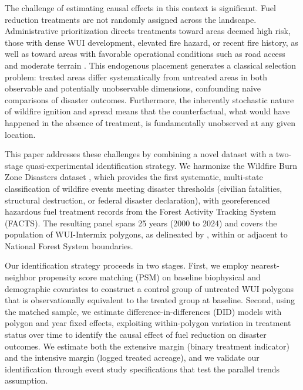\documentclass[12pt, letterpaper]{article}
\begin{document}
The challenge of estimating causal effects in this context is significant. Fuel reduction treatments are not randomly assigned across the landscape. Administrative prioritization directs treatments toward areas deemed high risk, those with dense WUI development, elevated fire hazard, or recent fire history, as well as toward areas with favorable operational conditions such as road access and moderate terrain \citep{thompson2013}. This endogenous placement generates a classical selection problem: treated areas differ systematically from untreated areas in both observable and potentially unobservable dimensions, confounding naive comparisons of disaster outcomes. Furthermore, the inherently stochastic nature of wildfire ignition and spread means that the counterfactual, what would have happened in the absence of treatment, is fundamentally unobserved at any given location.

This paper addresses these challenges by combining a novel dataset with a two-stage quasi-experimental identification strategy. We harmonize the Wildfire Burn Zone Disasters dataset \citep{wilner2025}, which provides the first systematic, multi-state classification of wildfire events meeting disaster thresholds (civilian fatalities, structural destruction, or federal disaster declaration), with georeferenced hazardous fuel treatment records from the Forest Activity Tracking System (FACTS). The resulting panel spans 25 years (2000 to 2024) and covers the population of WUI-Intermix polygons, as delineated by \citet{radeloff2018}, within or adjacent to National Forest System boundaries.

Our identification strategy proceeds in two stages. First, we employ nearest-neighbor propensity score matching (PSM) on baseline biophysical and demographic covariates to construct a control group of untreated WUI polygons that is observationally equivalent to the treated group at baseline. Second, using the matched sample, we estimate difference-in-differences (DID) models with polygon and year fixed effects, exploiting within-polygon variation in treatment status over time to identify the causal effect of fuel reduction on disaster outcomes. We estimate both the extensive margin (binary treatment indicator) and the intensive margin (logged treated acreage), and we validate our identification through event study specifications that test the parallel trends assumption.
\end{document}
